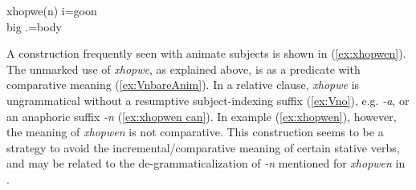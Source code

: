 \ea\label{ex:xhopwen i-X}
\gll 	xhopwe(n) i=goon	\\
	big	.=body\\
\glt	{}
\z
%
%
%
%

A construction frequently seen with animate subjects is shown in (\ref{ex:xhopwen}). The unmarked use of \textit{xhopwe}, as explained above, is as a predicate with comparative meaning (\ref{ex:VnbareAnim}). In a relative clause, \textit{xhopwe} is ungrammatical without a resumptive subject-indexing suffix (\ref{ex:Vno}), e.g. \textit{-a}, or an anaphoric suffix \textit{-n} (\ref{ex:xhopwen can}). In example (\ref{ex:xhopwen}), however, the meaning of \textit{xhopwen} is not comparative. This construction seems to be a strategy to avoid the incremental\slash comparative meaning of certain stative verbs, and may be related to the de\hyp grammaticalization of \textit{-n} mentioned for \textit{xhopwen} in .


\z


\z

\z

